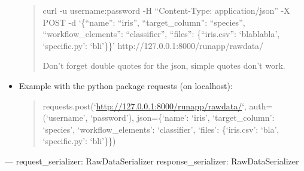 \documentclass[letterpaper,10pt,english]{sphinxmanual}
\begin{document}
\begin{fulllineitems}
\begin{fulllineitems}
\begin{itemize}
\begin{quote}
curl -u username:password   -H ``Content-Type: application/json''            -X POST            -d `\{``name'': ``iris'', ``target\_column'': ``species'',                 ``workflow\_elements'': ``classifier'',                ``files'': \{``iris.csv'': `blablabla', `specific.py': `bli'\}\}'                http://127.0.0.1:8000/runapp/rawdata/

Don't forget double quotes for the json, simple quotes don't work.
\end{quote}

\item {} 
Example with the python package requests (on localhost):
\begin{quote}

requests.post(`\url{http://127.0.0.1:8000/runapp/rawdata/}`,                          auth=(`username', `password'),                          json=\{`name': `iris', `target\_column': `species',                                 `workflow\_elements': `classifier',                        `files': \{`iris.csv': `bla', `specific.py': `bli'\}\})
\end{quote}

\end{itemize}

---
request\_serializer: RawDataSerializer
response\_serializer: RawDataSerializer

\end{fulllineitems}


\end{fulllineitems}

\end{document}
